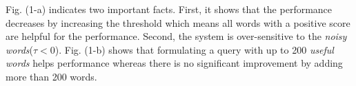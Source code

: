 \documentclass{sig-alternate}
\begin{document}
Fig. (1-a) indicates two important facts. First, it shows that the performance decreases by increasing the threshold which means all words with a positive score are helpful for the performance. Second, the system is over-sensitive to the {\em noisy words}($ \tau<0 $). Fig. (1-b) shows that formulating a query with up to 200 {\em useful words} helps performance whereas there is no significant improvement by adding more than 200 words. 


\end{document}
